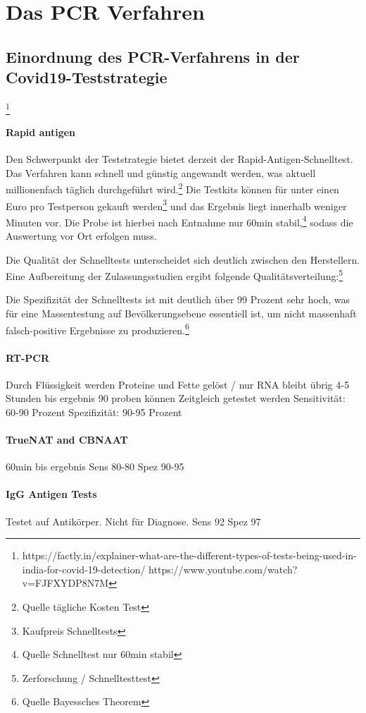 \chapter{Das PCR Verfahren}
\section{Einordnung des PCR-Verfahrens in der Covid19-Teststrategie}
\footnote{https://factly.in/explainer-what-are-the-different-types-of-tests-being-used-in-india-for-covid-19-detection/  https://www.youtube.com/watch?v=FJFXYDP8N7M}
\subsubsection{Rapid antigen}
Den Schwerpunkt der Teststrategie bietet derzeit der Rapid-Antigen-Schnelltest.
Das Verfahren kann schnell und günstig angewandt werden, was aktuell millionenfach täglich durchgeführt wird.\footnote{Quelle tägliche Kosten Test}
Die Testkits können für unter einen Euro pro Testperson gekauft werden\footnote{Kaufpreis Schnelltests}
und das Ergebnis liegt innerhalb weniger Minuten vor.
Die Probe ist hierbei nach Entnahme nur 60min stabil,\footnote{Quelle Schnelltest nur 60min stabil}
sodass die Auswertung vor Ort erfolgen muss.

Die Qualität der Schnelltests unterscheidet sich deutlich zwischen den Herstellern.
Eine Aufbereitung der Zulassungsstudien ergibt folgende Qualitätsverteilung:\footnote{Zerforschung / Schnelltesttest}

Die Spezifizität der Schnelltests ist mit deutlich über 99 Prozent sehr hoch, was für eine Massentestung auf Bevölkerungsebene essentiell ist, um nicht massenhaft falsch-positive Ergebnisse zu produzieren.\footnote{Quelle Bayessches Theorem}

\subsubsection{RT-PCR}
Durch Flüssigkeit werden Proteine und Fette gelöst / nur RNA bleibt übrig
4-5 Stunden bis ergebnis
90 proben können Zeitgleich getestet werden
Sensitivität: 60-90 Prozent
Spezifizität: 90-95 Prozent

\subsubsection{TrueNAT and CBNAAT}
60min bis ergebnis
Sens 80-80
Spez 90-95

\subsubsection{IgG Antigen Tests}
Testet auf Antikörper. Nicht für Diagnose.
Sens 92
Spez 97


